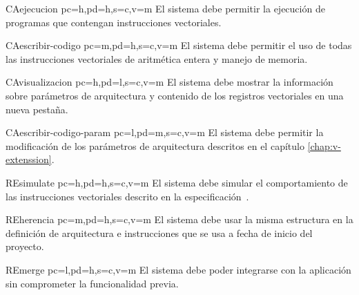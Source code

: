 \printureqtemplate{}

\begin{userReq}{CA}{ejecucion}
    {pc=h,pd=h,s=c,v=m}
    El sistema debe permitir la ejecución de programas que contengan instrucciones vectoriales.
\end{userReq}

\begin{userReq}{CA}{escribir-codigo}
    {pc=m,pd=h,s=c,v=m}
    El sistema debe permitir el uso de todas las instrucciones vectoriales de aritmética entera y manejo de memoria.
\end{userReq}

\begin{userReq}{CA}{visualizacion}
    {pc=h,pd=l,s=c,v=m}
    El sistema debe mostrar la información sobre parámetros de arquitectura y contenido de los registros vectoriales en una nueva pestaña.
\end{userReq}

\begin{userReq}{CA}{escribir-codigo-param}
    {pc=l,pd=m,s=c,v=m}
    El sistema debe permitir la modificación de los parámetros de arquitectura descritos en el capítulo \ref{chap:v-extenssion}.
\end{userReq}

\begin{userReq}{RE}{simulate}
    {pc=h,pd=h,s=c,v=m}
    El sistema debe simular el comportamiento de las instrucciones vectoriales descrito en la especificación~\cite{riscv-isa2024}. 
\end{userReq}

\begin{userReq}{RE}{herencia}
    {pc=m,pd=h,s=c,v=m}
    El sistema debe usar la misma estructura en la definición de arquitectura e instrucciones que se usa a fecha de inicio del proyecto.
\end{userReq}

\begin{userReq}{RE}{merge}
    {pc=l,pd=h,s=c,v=m}
    El sistema debe poder integrarse con la aplicación sin comprometer la funcionalidad previa.
\end{userReq}

\FloatBarrier

